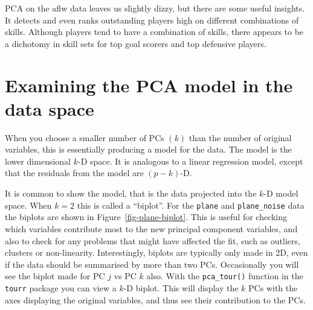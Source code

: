 \documentclass[
  letterpaper,
]{book}
\begin{document}
PCA on the aflw data leaves us slightly dizzy, but there are some useful
insights. It detects and even ranks outstanding players high on
different combinations of skills. Although players tend to have a
combination of skills, there appears to be a dichotomy in skill sets for
top goal scorers and top defensive players.

\hypertarget{examining-the-pca-model-in-the-data-space}{%
\section{Examining the PCA model in the data
space}\label{examining-the-pca-model-in-the-data-space}}

When you choose a smaller number of PCs \((k)\) than the number of
original variables, this is essentially producing a model for the data.
The model is the lower dimensional \(k\)-D space. It is analogous to a
linear regression model, except that the residuals from the model are
\((p-k)\)-D.

It is common to show the model, that is the data projected into the
\(k\)-D model space. When \(k=2\) this is called a ``biplot''. For the
\texttt{plane} and \texttt{plane\_noise} data the biplots are shown in
Figure~\ref{fig-plane-biplot}. This is useful for checking which
variables contribute most to the new principal component variables, and
also to check for any problems that might have affected the fit, such as
outliers, clusters or non-linearity. Interestingly, biplots are
typically only made in 2D, even if the data should be summarised by more
than two PCs. Occasionally you will see the biplot made for PC \(j\) vs
PC \(k\) also. With the \texttt{pca\_tour()} function in the
\texttt{tourr} package you can view a \(k\)-D biplot. This will display
the \(k\) PCs with the axes displaying the original variables, and thus
see their contribution to the PCs.
\end{document}
